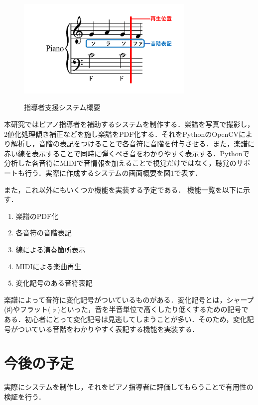 \documentclass[twocolumn,10pt,a4j]{jsarticle}
\begin{document}
\begin{figure}[h]
\begin{center}
 \includegraphics[clip,width=85mm,height=55mm]{image2.pdf}
\end{center}
 \caption{指導者支援システム概要}
 \label{fig:教科書}
\end{figure}
本研究ではピアノ指導者を補助するシステムを制作する．楽譜を写真で撮影し，2値化処理傾き補正などを施し楽譜をPDF化する．それをPythonのOpenCVにより解析し，音階の表記をつけることで各音符に音階を付与させる．また，楽譜に赤い線を表示することで同時に弾くべき音をわかりやすく表示する．Pythonで分析した各音符にMIDIで音情報を加えることで視覚だけではなく，聴覚のサポートも行う．実際に作成するシステムの画面概要を図1で表す．

また，これ以外にもいくつか機能を実装する予定である．
機能一覧を以下に示す．

\begin{enumerate}
\item 楽譜のPDF化
\item 各音符の音階表記
\item 線による演奏箇所表示
\item MIDIによる楽曲再生
\item 変化記号のある音符表記
\end{enumerate}

楽譜によって音符に変化記号がついているものがある．変化記号とは，シャープ(♯)やフラット(♭)といった，音を半音単位で高くしたり低くするための記号である．初心者にとって変化記号は見逃してしまうことが多い．そのため，変化記号がついている音階をわかりやすく表記する機能を実装する．

\section{今後の予定}
実際にシステムを制作し，それをピアノ指導者に評価してもらうことで有用性の検証を行う．
\end{document}

